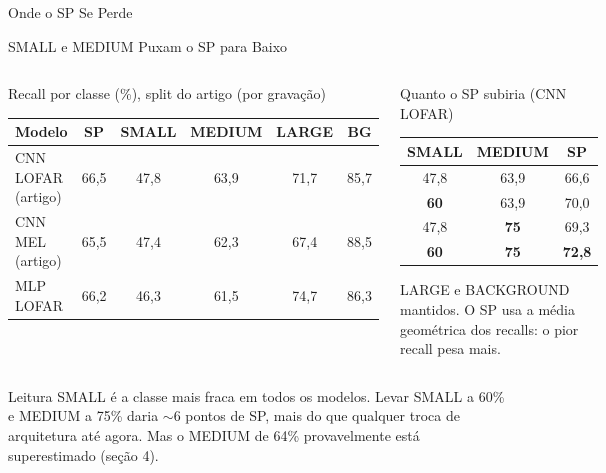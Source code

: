 \documentclass[aspectratio=169]{beamer}
\newcommand{\cahi}[1]{\cellcolor{green!30}\textbf{#1}}
\newcommand{\calo}[1]{\cellcolor{red!20}#1}
\newcommand{\camd}[1]{\cellcolor{yellow!35}#1}
\begin{document}
\begin{frame}
    \centering
    \huge Onde o SP Se Perde
\end{frame}

\begin{frame}{SMALL e MEDIUM Puxam o SP para Baixo}
    \footnotesize
    \begin{columns}[t]
        \begin{block}{\small Recall por classe (\%), split do artigo (por gravação)}
            \scriptsize
            \centering
            \setlength{\tabcolsep}{2.5pt}
            \begin{tabular}{lccccc}
            \toprule
            Modelo & SP & SMALL & MEDIUM & LARGE & BG \\
            \midrule
            CNN LOFAR (artigo) & 66,5 & \calo{47,8} & \camd{63,9} & 71,7 & 85,7 \\
            CNN MEL (artigo) & 65,5 & \calo{47,4} & \camd{62,3} & 67,4 & 88,5 \\
            MLP LOFAR & 66,2 & \calo{46,3} & \camd{61,5} & 74,7 & 86,3 \\
            \bottomrule
            \end{tabular}
        \end{block}
        \begin{block}{\small Quanto o SP subiria (CNN LOFAR)}
            \scriptsize
            \centering
            \setlength{\tabcolsep}{4pt}
            \begin{tabular}{ccc}
            \toprule
            SMALL & MEDIUM & SP \\
            \midrule
            47,8 & 63,9 & 66,6 \\
            \textbf{60} & 63,9 & 70,0 \\
            47,8 & \textbf{75} & 69,3 \\
            \textbf{60} & \textbf{75} & \cahi{72,8} \\
            \bottomrule
            \end{tabular}

            \vspace{0.05cm}
            {\tiny LARGE e BACKGROUND mantidos. O SP usa a média geométrica dos recalls: o pior recall pesa mais.\par}
        \end{block}
    \end{columns}
    \vspace{0.1cm}
    \begin{alertblock}{Leitura}
        \scriptsize
        SMALL é a classe mais fraca em todos os modelos. Levar SMALL a 60\% e MEDIUM a 75\% daria $\sim$6 pontos de SP, mais do que qualquer troca de arquitetura até agora. Mas o MEDIUM de 64\% provavelmente está superestimado (seção 4).
    \end{alertblock}
\end{frame}
\end{document}
